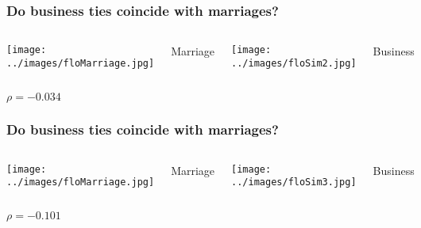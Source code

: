 \documentclass{beamer}
\begin{document}
\begin{frame}
\frametitle{Do business ties coincide with marriages?}

\begin{columns}
\column{5.5cm} %
\texttt{[image: ../images/floMarriage.jpg]}
\begin{center}
Marriage
\end{center}
\column{6cm} %
\texttt{[image: ../images/floSim2.jpg]}
\begin{center}
Business
\end{center}
\end{columns}
\begin{center}
$\rho = -0.034$
\end{center}
\end{frame}

\begin{frame}
\frametitle{Do business ties coincide with marriages?}

\begin{columns}
\column{5.5cm} %
\texttt{[image: ../images/floMarriage.jpg]}
\begin{center}
Marriage
\end{center}
\column{6cm} %
\texttt{[image: ../images/floSim3.jpg]}
\begin{center}
Business
\end{center}
\end{columns}
\begin{center}
$\rho = -0.101$
\end{center}
\end{frame}

\end{document}
